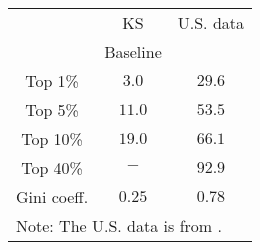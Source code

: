 \begin{center}
\begin{tabular}{l|c|c}
\hline
& KS & U.S. data \\ 
\multicolumn{1}{c|}{} & Baseline &  \\ \hline\hline
\multicolumn{1}{c|}{Top 1\%} & $3.0$ & $29.6$ \\ 
\multicolumn{1}{c|}{Top 5\%} & $11.0$ & $53.5$ \\ 
\multicolumn{1}{c|}{Top 10\%} & $19.0$ & $66.1$ \\ 
\multicolumn{1}{c|}{Top 40\%} & $-$ & $92.9$ \\ \hline
Gini coeff. & $0.25$ & $0.78$ \\ \hline
\multicolumn{3}{l}{\small Note: The U.S. data is from \text{\citet{castaneda}}.}
\end{tabular}
\end{center}
